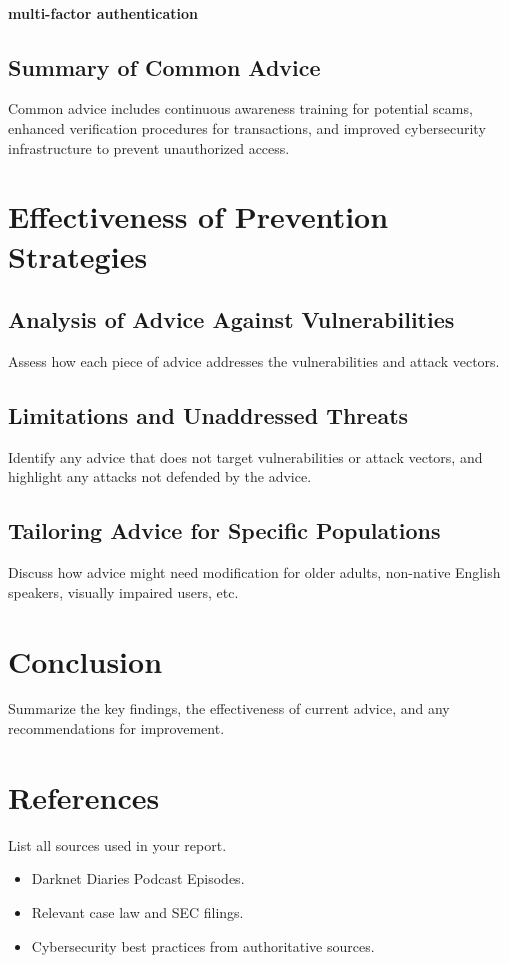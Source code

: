 \documentclass[11pt]{article}
\begin{document}
\paragraph*{multi-factor authentication}
\subsection{Summary of Common Advice}
Common advice includes continuous awareness training for potential scams, enhanced verification procedures for transactions, and improved cybersecurity infrastructure to prevent unauthorized access.


\section{Effectiveness of Prevention Strategies}
\subsection{Analysis of Advice Against Vulnerabilities}
Assess how each piece of advice addresses the vulnerabilities and attack vectors.

\subsection{Limitations and Unaddressed Threats}
Identify any advice that does not target vulnerabilities or attack vectors, and highlight any attacks not defended by the advice.

\subsection{Tailoring Advice for Specific Populations}
Discuss how advice might need modification for older adults, non-native English speakers, visually impaired users, etc.

\section{Conclusion}
Summarize the key findings, the effectiveness of current advice, and any recommendations for improvement.

\section{References}
List all sources used in your report.
\begin{itemize}
\item Darknet Diaries Podcast Episodes.
\item Relevant case law and SEC filings.
\item Cybersecurity best practices from authoritative sources.
\end{itemize}
\end{document}
